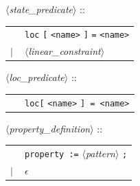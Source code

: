 \documentclass[a4paper,11pt]{report}
\newcommand{\emptystring}{$\epsilon$}
\newcommand{\nt}[1]{$\langle$\emph{#1}$\rangle$}
\newcommand{\regleGrammaire}[1]{\bigskip \noindent \nt{#1} :: \\}
\newcommand{\styleIMI}[1]{\textcolor{imicolor}{\texttt{#1}}}
\begin{document}
\regleGrammaire{state\_predicate}
\begin{tabular}{l l}
	\  & \styleIMI{loc} \styleIMI{[} \styleIMI{<name>} \styleIMI{]} \styleIMI{=} \styleIMI{<name>} \\
	$|$ & \nt{linear\_constraint} \\
\end{tabular}

\regleGrammaire{loc\_predicate}
\begin{tabular}{l l}
	\  & \styleIMI{loc[} \styleIMI{<name>} \styleIMI{] = \styleIMI{<name>}} \\
\end{tabular}






\regleGrammaire{property\_definition}
\begin{tabular}{l l}
	\  & \styleIMI{property :=} \nt{pattern} \styleIMI{;} \\
	$|$ & \emptystring \\
\end{tabular}
\end{document}
